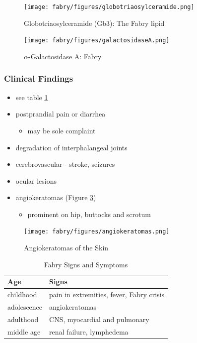 \documentclass[12pt]{scrartcl}
\begin{document}
\begin{figure}[htbp]
\centering
\texttt{[image: fabry/figures/globotriaosylceramide.png]}
\caption[Globotriaosylceramide]{\label{fig:orgc0b0ecb}Globotriaosylceramide (Gb3): The Fabry lipid}
\end{figure}

\begin{figure}[htbp]
\centering
\texttt{[image: fabry/figures/galactosidaseA.png]}
\caption[\(\alpha\)-galactosidase A]{\label{fig:org5e41483}\(\alpha\)-Galactosidase A: Fabry}
\end{figure}


\subsubsection{Clinical Findings}
\label{sec:org60ee9fa}
\begin{itemize}
\item see table \ref{tab:org1bd5ca7}
\item postprandial pain or diarrhea
\begin{itemize}
\item may be sole complaint
\end{itemize}
\item degradation of interphalangeal joints
\item cerebrovascular - stroke, seizures
\item ocular lesions
\item angiokeratomas (Figure \ref{fig:orgf36cf21})
\begin{itemize}
\item prominent on hip, buttocks and scrotum
\end{itemize}
\end{itemize}

\begin{figure}[htbp]
\centering
\texttt{[image: fabry/figures/angiokeratomas.png]}
\caption[Angiokeratomas of the skin]{\label{fig:orgf36cf21}Angiokeratomas of the Skin}
\end{figure}

\begin{table}[htbp]
\caption{\label{tab:org1bd5ca7}Fabry Signs and Symptoms}
\centering
\begin{tabular}{ll}
Age & Signs\\
\hline
childhood & pain in extremities, fever, Fabry crisis \footnotemark\\
adolescence & angiokeratomas\\
adulthood & CNS, myocardial and pulmonary\\
middle age & renal failure, lymphedema\\
\end{tabular}
\end{table}
\end{document}
